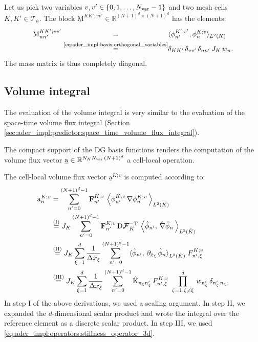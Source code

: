 \documentclass{scrreprt}
\theoremstyle{definition}
\theoremstyle{nonumberplain}
\renewcommand{\vec}[1]{{\textbf{#1}}}
\newcommand{\laVec}[1]{\underline{\mathrm{#1}}}
\newcommand{\laVecel}[1]{\mathrm{#1}}
\newcommand{\laMat}[1]{\underline{\mathrm{#1}}}
\newcommand{\laMatel}[1]{\mathrm{#1}}
\newcommand{\tria}{\mathcal{T}_h}
\newcommand{\cell}{K}
\newcommand{\dV}{\text{d}\vec{x}}
\newcommand{\refVec}[1]{\hat{\vec{#1}}}
\newcommand{\refCell}{\hat{\cell}}
\newcommand{\jacobian}{\textup{D}\boldsymbol{\mathcal{F}}_{\cell}}
\begin{document}
Let us pick two variables $v,v'\in\{0,1,\ldots,N_\textup{var}-1\}$
and two mesh cells $\cell,\cell'\in\tria$.
The block $\laMat{M}^{\cell\cell';vv'}\in\mathbb{R}^{(N+1)^{d}\times(N+1)^{d}}$
has the elements:
\begin{align}
\laMatel{M}^{\cell\cell';vv'}_{nn'}
\overset{\phantom{\textup{\eqref{eq:ader_impl:basis:orthogonal_variables}}}}{=}&
\langle {\phi}^{\cell';v'}_{n'},{\phi}^{\cell;v}_{n}\rangle
_{L^2 (\cell) }\,
\notag
\\
\label{eq:ader_impl:correction:mass_operator}
\overset{\textup{\eqref{eq:ader_impl:basis:orthogonal_variables}}}{=}&
\delta_{\cell\cell'}\,\delta_{vv'}\,\delta_{nn'}\,
J_\cell\,w_{n}.
\end{align}
The mass matrix is thus completely diagonal.

\subsection{Volume integral}
The evaluation of the volume integral is very similar 
to the evaluation of the space-time volume flux integral
(Section \ref{sec:ader_impl:predictor:space_time_volume_flux_integral}).

The compact support of the DG basis functions renders the computation of the
volume flux vector $\laVec{a}\in\mathbb{R}^{N_\cell
N_\textup{var}\,(N+1)^d}$ a cell-local operation.

The cell-local volume flux vector $\laVec{a}^{\cell;v}$ is computed
according to:
\begin{align*}
\laVecel{a}^{\cell;v}_{n}
&=
\sum_{n'=0}^{(N+1)^d-1}
\vec{F}^{K;v}_{n'}\,
\left\langle
{\phi}^{K;v}_{n'}\,
\nabla {\phi}^{K;v}_{n}\,
\right\rangle
_{L^2(\cell)}
\\
&\overset{(\textup{I})}
{=}
J_\cell
\sum_{n'=0}^{(N+1)^d-1}
\vec{F}^{K;v}_{n'}\,
\jacobian^{-\textup{T}}\,
\left\langle
\hat{\phi}_{n'},\,
\hat{\nabla}
\hat{\phi}_{n}\,
\right\rangle
_{L^2(\refCell)}
\,
\\
&\overset{(\textup{II})}
{=}
J_\cell
\sum_{\xi=1}^d
\frac{1}{\Delta x_\xi}
\sum_{n'=0}^{(N+1)^d-1}
\langle
\hat{\phi}_{n'},\,
\partial_{\hat{x}_{\xi}}\,\hat{\phi}_{n}
\rangle_{L^2(\refCell)}
\;F^{\cell;v}_{n',\xi}
\\
&\overset{(\textup{III})}
{=}
J_\cell
\sum_{\xi =1}^d
\frac{1}{\Delta x_\xi}
\sum_{n'=0}^{(N+1)^d-1}
\laMatel{\hat{K}}_{n_\xi n'_\xi}\,
F^{\cell;v}_{n',\xi}\,
\,\prod^{d}_{\zeta=1,\zeta\neq\xi}\,w_{n'_\zeta}\,\delta_{n'_\zeta\,n_\zeta},
\end{align*}
In step I of the above derivations, we used a scaling argument.
In step II, we expanded the $d$-dimensional scalar product and
wrote the integral over the reference element as a discrete scalar product.
In step III, we used \eqref{eq:ader_impl:operators:stiffness_operator_3d}.
\end{document}
